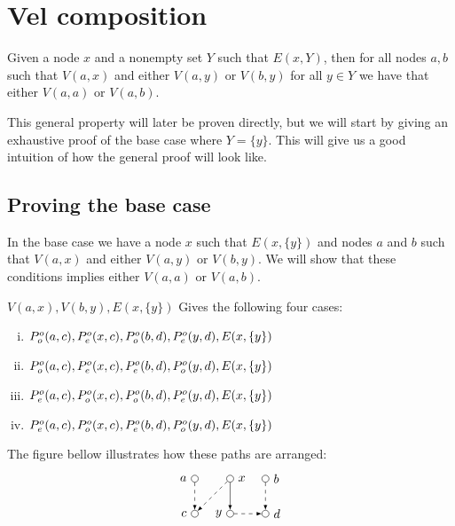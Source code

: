 \section{Vel composition}
\label{sec:Vel composition}
\begin{theorem}
  Given a node $x$ and a nonempty set $Y$ such that $E(x,Y)$, then for all nodes $a,b$ such that $V(a,x)$ and either $V(a,y)$ or $V(b,y)$ for all $y \in Y$ we have that either $V(a,a)$ or $V(a,b)$.
\end{theorem}
This general property will later be proven directly, but we will start by giving an exhaustive proof of the base case where $Y=\{ y \}$.
This will give us a good intuition of how the general proof will look like.
\subsection{Proving the base case}
\label{sub:Proving the base case}
In the base case we have a node $x$ such that $E(x,\{ y \})$ and nodes $a$ and $b$ such that $V(a,x)$ and either $V(a,y)$ or $V(b,y)$.
We will show that these conditions implies either $V(a,a)$ or $V(a,b)$.

$V(a,x),V(b,y),E(x,\{y\})$ Gives the following four cases:
\begin{enumerate}[(i)]
  \item $P^o_o(a,c), P^o_e(x,c), P^o_o(b,d), P^o_e(y,d), E(x,\{y\})$
  \item $P^o_o(a,c), P^o_e(x,c), P^o_e(b,d), P^o_o(y,d), E(x,\{y\})$
  \item $P^o_e(a,c), P^o_o(x,c), P^o_o(b,d), P^o_e(y,d), E(x,\{y\})$
  \item $P^o_e(a,c), P^o_o(x,c), P^o_e(b,d), P^o_o(y,d), E(x,\{y\})$
\end{enumerate}
The figure bellow illustrates how these paths are arranged:
\[
\begin{tikzpicture}
  [point/.style={circle,draw,inner sep=0pt,minimum size=2mm}]
  \node (a) at (0,1) [point,label=left:$a$] {};
  \node (b) at (2,1) [point,label=right:$b$] {};

  \node (x) at (1,1) [point,label=right:$x$] {};
  \node (y) at (1,0) [point,label=left:$y$] {};

  \node (c) at (0,0) [point,label=left:$c$] {};
  \node (d) at (2,0) [point,label=right:$d$] {};

  \draw [-latex] (x) to (y);
  \draw [-latex,dashed,label=left:$o$] (a) to (c);
  \draw [-latex,dashed,label=left:$e$] (x) to (c);
  \draw [-latex,dashed,label=right:$o$] (b) to (d);
  \draw [-latex,dashed,label=above:$e$] (y) to (d);
\end{tikzpicture}
\]
\clearpage
